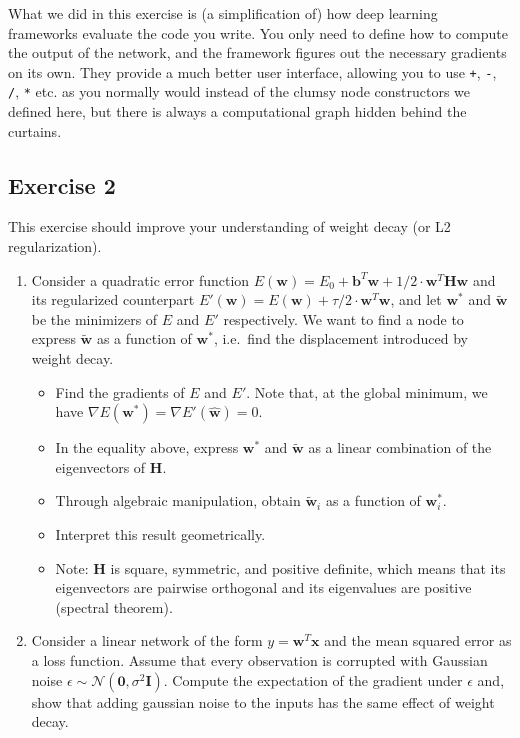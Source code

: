 \documentclass[
  a4paper,
]{article}
\providecommand{\tightlist}{%
  \setlength{\itemsep}{0pt}\setlength{\parskip}{0pt}}
\begin{document}
What we did in this exercise is (a simplification of) how deep learning
frameworks evaluate the code you write. You only need to define how to
compute the output of the network, and the framework figures out the
necessary gradients on its own. They provide a much better user
interface, allowing you to use \texttt{+}, \texttt{-}, \texttt{/},
\texttt{*} etc. as you normally would instead of the clumsy node
constructors we defined here, but there is always a computational graph
hidden behind the curtains.

\hypertarget{exercise-2}{%
\subsection{Exercise 2}\label{exercise-2}}

This exercise should improve your understanding of weight decay (or L2
regularization).

\begin{enumerate}
\def\labelenumi{\arabic{enumi}.}
\item
  Consider a quadratic error function
  \(E(\textbf{w})=E_0+\textbf{b}^T\textbf{w}+1/2\cdot\textbf{w}^T\textbf{H}\textbf{w}\)
  and its regularized counterpart
  \(E'(\textbf{w})=E(\textbf{w})+\tau/2 \cdot\textbf{w}^T\textbf{w}\),
  and let \(\textbf{w}^*\) and \(\tilde{\textbf{w}}\) be the minimizers
  of \(E\) and \(E'\) respectively. We want to find a node to express
  \(\tilde{\textbf{w}}\) as a function of \(\textbf{w}^*\), i.e.~find
  the displacement introduced by weight decay.

  \begin{itemize}
  \tightlist
  \item
    Find the gradients of \(E\) and \(E'\). Note that, at the global
    minimum, we have
    \(\nabla E(\textbf{w}^*)=\nabla E'(\hat{\textbf{w}})=0\).
  \item
    In the equality above, express \(\textbf{w}^*\) and
    \(\tilde{\textbf{w}}\) as a linear combination of the eigenvectors
    of \(\textbf{H}\).
  \item
    Through algebraic manipulation, obtain \(\tilde{\textbf{w}}_i\) as a
    function of \(\textbf{w}^*_i\).
  \item
    Interpret this result geometrically.
  \item
    Note: \(\textbf{H}\) is square, symmetric, and positive definite,
    which means that its eigenvectors are pairwise orthogonal and its
    eigenvalues are positive (spectral theorem).
  \end{itemize}
\item
  Consider a linear network of the form \(y=\textbf{w}^T\textbf{x}\) and
  the mean squared error as a loss function. Assume that every
  observation is corrupted with Gaussian noise
  \(\epsilon\sim\mathcal{N}(\textbf{0}, \sigma^2\textbf{I})\). Compute
  the expectation of the gradient under \(\epsilon\) and, show that
  adding gaussian noise to the inputs has the same effect of weight
  decay.
\end{enumerate}
\end{document}
